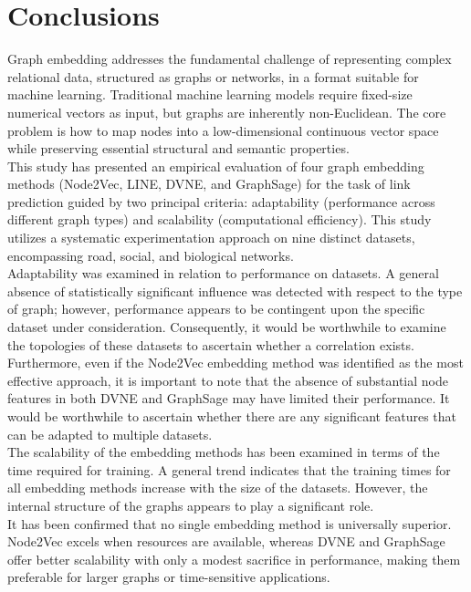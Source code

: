 \section{Conclusions}

Graph embedding addresses the fundamental challenge of representing complex relational data, structured as graphs or networks, in a format suitable for machine learning. 
Traditional machine learning models require fixed-size numerical vectors as input, but graphs are inherently non-Euclidean.
The core problem is how to map nodes into a low-dimensional continuous vector space while preserving essential structural and semantic properties.
\\\newline
This study has presented an empirical evaluation of four graph embedding methods (Node2Vec, LINE, DVNE, and GraphSage) for the task of link prediction guided by two principal criteria: adaptability (performance across different graph types) and scalability (computational efficiency). This study utilizes a systematic experimentation approach on nine distinct datasets, encompassing road, social, and biological networks.
\\\newline
Adaptability was examined in relation to performance on datasets. 
A general absence of statistically significant influence was detected with respect to the type of graph; however, performance appears to be contingent upon the specific dataset under consideration. 
Consequently, it would be worthwhile to examine the topologies of these datasets to ascertain whether a correlation exists.
\\
Furthermore, even if the Node2Vec embedding method was identified as the most effective approach, it is important to note that the absence of substantial node features in both DVNE and GraphSage may have limited their performance.
It would be worthwhile to ascertain whether there are any significant features that can be adapted to multiple datasets.
\\\newline
The scalability of the embedding methods has been examined in terms of the time required for training.
A general trend indicates that the training times for all embedding methods increase with the size of the datasets. 
However, the internal structure of the graphs  appears to play a significant role.
\\\newline
It has been confirmed that no single embedding method is universally superior. 
Node2Vec excels when resources are available, whereas DVNE and GraphSage offer better scalability with only a modest sacrifice in performance, making them preferable for larger graphs or time-sensitive applications. 